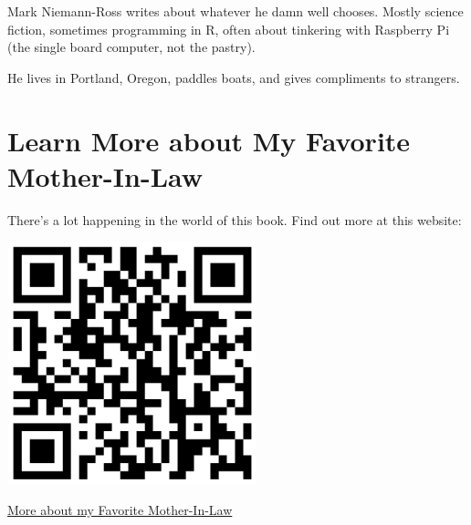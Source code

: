 \documentclass[
  letterpaper,
  DIV=11,
  numbers=noendperiod]{scrreprt}
\begin{document}
Mark Niemann-Ross writes about whatever he damn well chooses. Mostly
science fiction, sometimes programming in R, often about tinkering with
Raspberry Pi (the single board computer, not the pastry).

He lives in Portland, Oregon, paddles boats, and gives compliments to
strangers.

\section*{Learn More about My Favorite
Mother-In-Law}\label{learn-more-about-my-favorite-mother-in-law}


There's a lot happening in the world of this book. Find out more at this
website:

\includegraphics[width=2.84375in,height=\textheight]{images/qr fave mother in law.png}

\href{http://niemannross.com/link/morefavemil}{More about my Favorite
Mother-In-Law}
\end{document}
